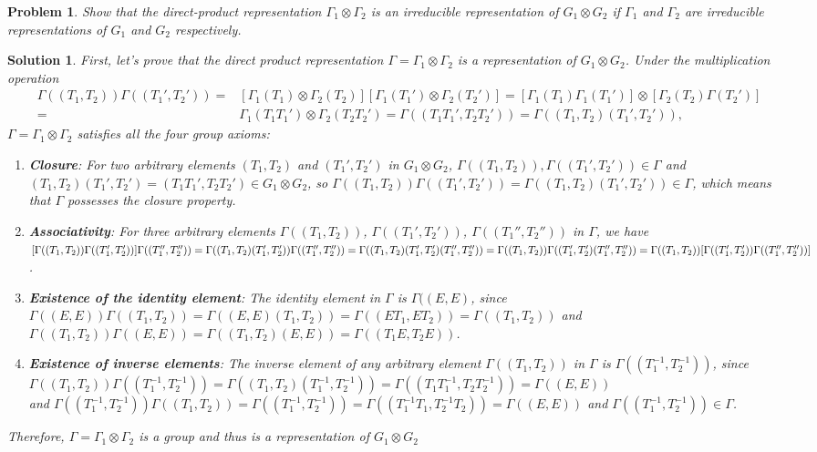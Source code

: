 \documentclass[UTF8,10pt,a4paper]{article}
\theoremstyle{Problem}
\newtheorem{prob}{Problem}
\theoremstyle{Solution}
\newtheorem*{sol}{Solution}
\begin{document}
\begin{prob}
    Show that the direct-product representation $\Gamma_1\otimes\Gamma_2$ is an irreducible representation of $G_1\otimes G_2$ if $\Gamma_1$ and $\Gamma_2$ are irreducible representations of $G_1$ and $G_2$ respectively.
\end{prob}
\begin{sol}
    First, let's prove that the direct product representation $\Gamma=\Gamma_1\otimes\Gamma_2$ is a representation of $G_1\otimes G_2$. Under the multiplication operation
    \begin{align}
        \nonumber\Gamma((T_1,T_2))\Gamma((T_1',T_2'))=&[\Gamma_1(T_1)\otimes\Gamma_2(T_2)][\Gamma_1(T_1')\otimes\Gamma_2(T_2')]=[\Gamma_1(T_1)\Gamma_1(T_1')]\otimes[\Gamma_2(T_2)\Gamma(T_2')]\\
        =&\Gamma_1(T_1T_1')\otimes\Gamma_2(T_2T_2')=\Gamma((T_1T_1',T_2T_2'))=\Gamma((T_1,T_2)(T_1',T_2')),
    \end{align}
    $\Gamma=\Gamma_1\otimes\Gamma_2$ satisfies all the four group axioms:
    \begin{enumerate}
        \item \textbf{Closure}: For two arbitrary elements $(T_1,T_2)$ and $(T_1',T_2')$ in $G_1\otimes G_2$, $\Gamma((T_1,T_2)),\Gamma((T_1',T_2'))\in\Gamma$ and $(T_1,T_2)(T_1',T_2')=(T_1T_1',T_2T_2')\in G_1\otimes G_2$, so $\Gamma((T_1,T_2))\Gamma((T_1',T_2'))=\Gamma((T_1,T_2)(T_1',T_2'))\in \Gamma$, which means that $\Gamma$ possesses the closure property.
        \item \textbf{Associativity}: For three arbitrary elements $\Gamma((T_1,T_2))$, $\Gamma((T_1',T_2'))$, $\Gamma((T_1'',T_2''))$ in $\Gamma$, we have\\
        $[\Gamma((T_1,T_2))\Gamma((T_1',T_2'))]\Gamma((T_1'',T_2''))=\Gamma((T_1,T_2)(T_1',T_2'))\Gamma((T_1'',T_2''))=\Gamma((T_1,T_2)(T_1',T_2')(T_1'',T_2''))\\=\Gamma((T_1,T_2))\Gamma((T_1',T_2')(T_1'',T_2''))=\Gamma((T_1,T_2))[\Gamma((T_1',T_2'))\Gamma((T_1'',T_2''))]$.
        \item \textbf{Existence of the identity element}: The identity element in $\Gamma$ is $\Gamma((E,E)$, since $\Gamma((E,E))\Gamma((T_1,T_2))=\Gamma((E,E)(T_1,T_2))=\Gamma((ET_1,ET_2))=\Gamma((T_1,T_2))$ and $\Gamma((T_1,T_2))\Gamma((E,E))=\Gamma((T_1,T_2)(E,E))=\Gamma((T_1E,T_2E))$.
        \item \textbf{Existence of inverse elements}: The inverse element of any arbitrary element $\Gamma((T_1,T_2))$ in $\Gamma$ is $\Gamma((T_1^{-1},T_2^{-1}))$, since $\Gamma((T_1,T_2))\Gamma((T_1^{-1},T_2^{-1}))=\Gamma((T_1,T_2)(T_1^{-1},T_2^{-1}))=\Gamma((T_1T_1^{-1},T_2T_2^{-1}))=\Gamma((E,E))$\\
        and $\Gamma((T_1^{-1},T_2^{-1}))\Gamma((T_1,T_2))=\Gamma((T_1^{-1},T_2^{-1}))=\Gamma((T_1^{-1}T_1,T_2^{-1}T_2))=\Gamma((E,E))$ and $\Gamma((T_1^{-1},T_2^{-1}))\in\Gamma$.
    \end{enumerate}
    Therefore, $\Gamma=\Gamma_1\otimes\Gamma_2$ is a group and thus is a representation of $G_1\otimes G_2$


\end{sol}
\end{document}
